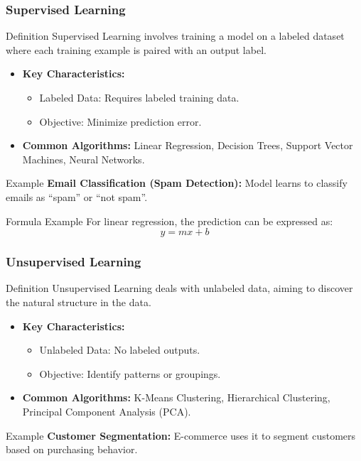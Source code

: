 \documentclass{beamer}
\begin{document}
\begin{frame}[fragile]
    \frametitle{Supervised Learning}
    \begin{block}{Definition}
        Supervised Learning involves training a model on a labeled dataset where each training example is paired with an output label.
    \end{block}
    \begin{itemize}
        \item \textbf{Key Characteristics:}
        \begin{itemize}
            \item Labeled Data: Requires labeled training data.
            \item Objective: Minimize prediction error.
        \end{itemize}
        \item \textbf{Common Algorithms:} Linear Regression, Decision Trees, Support Vector Machines, Neural Networks.
    \end{itemize}
    \begin{block}{Example}
        \textbf{Email Classification (Spam Detection):} Model learns to classify emails as “spam” or “not spam”.
    \end{block}
    \begin{block}{Formula Example}
        For linear regression, the prediction can be expressed as:
        \begin{equation}
            y = mx + b
        \end{equation}
    \end{block}
\end{frame}

\begin{frame}[fragile]
    \frametitle{Unsupervised Learning}
    \begin{block}{Definition}
        Unsupervised Learning deals with unlabeled data, aiming to discover the natural structure in the data.
    \end{block}
    \begin{itemize}
        \item \textbf{Key Characteristics:}
        \begin{itemize}
            \item Unlabeled Data: No labeled outputs.
            \item Objective: Identify patterns or groupings.
        \end{itemize}
        \item \textbf{Common Algorithms:} K-Means Clustering, Hierarchical Clustering, Principal Component Analysis (PCA).
    \end{itemize}
    \begin{block}{Example}
        \textbf{Customer Segmentation:} E-commerce uses it to segment customers based on purchasing behavior.
    \end{block}
\end{frame}
\end{document}
